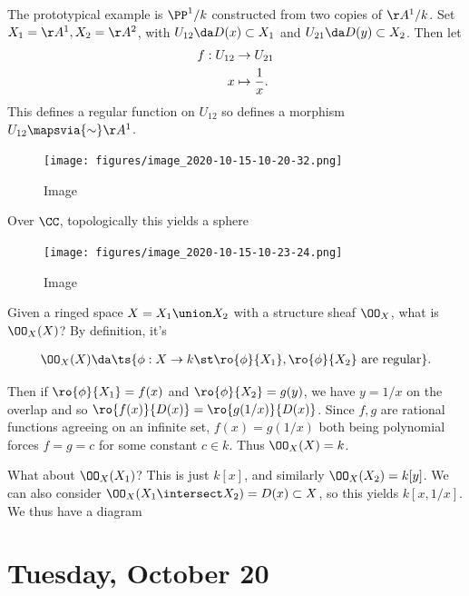 \begin{example}

The prototypical example is \(\PP^1/k\) constructed from two copies of
\(\AA^1/k\). Set \(X_1 = \AA^1, X_2 = \AA^2\), with
\(U_{12} \da D(x) \subset X_1\) and \(U_{21} \da D(y) \subset X_2\).
Then let
\begin{align*}  
f: U_{12} &\to U_{21} \\
x & \mapsto {1\over x}
.\end{align*} This defines a regular function on \(U_{12}\) so defines a
morphism \(U_{12} \mapsvia{\sim} \AA^1\).

\begin{figure}
\centering
\texttt{[image: figures/image\_2020-10-15-10-20-32.png]}
\caption{Image}
\end{figure}

Over \(\CC\), topologically this yields a sphere

\begin{figure}
\centering
\texttt{[image: figures/image\_2020-10-15-10-23-24.png]}
\caption{Image}
\end{figure}

Given a ringed space \(X = X_1\union X_2\) with a structure sheaf
\(\OO_X\), what is \(\OO_X(X)\)? By definition, it's

\begin{align*}  
\OO_X(X) \da \ts{\phi: X\to k \st \ro{\phi}{X_1}, \ro{\phi}{X_2} \text{ are regular} }
.\end{align*}

Then if \(\ro{\phi}{X_1} = f(x)\) and \(\ro{\phi}{X_2} = g(y)\), we have
\(y=1/x\) on the overlap and so \(\ro{f(x)}{D(x)} = \ro{g(1/x)}{D(x)}\).
Since \(f, g\) are rational functions agreeing on an infinite set,
\(f(x) = g(1/x)\) both being polynomial forces \(f = g = c\) for some
constant \(c \in k\). Thus \(\OO_X(X) = k\).

What about \(\OO_X(X_1)\)? This is just \(k[x]\), and similarly
\(\OO_X(X_2) = k[y]\). We can also consider
\(\OO_X(X_1\intersect X_2) = D(x) \subset X\), so this yields
\(k[x, 1/x]\). We thus have a diagram

\begin{center}\end{center}

\end{example}

\hypertarget{tuesday-october-20}{%
\section{Tuesday, October 20}\label{tuesday-october-20}}

